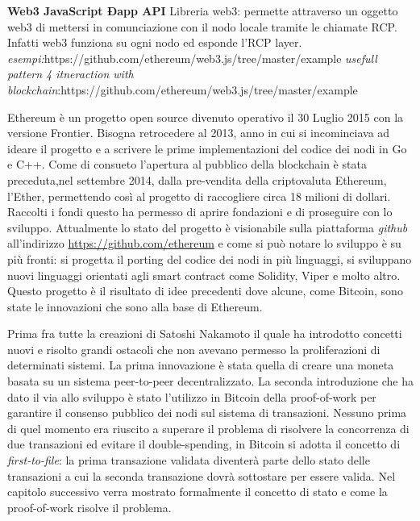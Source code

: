 \begin{enumerate}
		
		\textbf{Web3 JavaScript Ðapp API} 
		Libreria web3: permette attraverso un oggetto web3 di mettersi in comunciazione con il nodo locale tramite le chiamate RCP. Infatti web3 funziona su ogni nodo ed esponde l'RCP layer.
		\textit{esempi:}https://github.com/ethereum/web3.js/tree/master/example
		\textit{usefull pattern 4 itneraction with blockchain}:https://github.com/ethereum/web3.js/tree/master/example
		\fi
		
		\end{enumerate} 
	\fi
	
	Ethereum è un progetto open source divenuto operativo il 30 Luglio 2015 con la versione Frontier. Bisogna retrocedere al 2013, anno in cui si incominciava ad ideare il progetto e a scrivere le prime implementazioni del codice dei nodi in Go e C++. Come di consueto l'apertura al pubblico della blockchain è stata preceduta,nel settembre 2014, dalla pre-vendita della criptovaluta Ethereum, l'Ether, permettendo così al progetto di raccogliere circa 18 milioni di dollari. Raccolti i fondi questo ha permesso di aprire fondazioni e di proseguire con lo sviluppo. Attualmente lo stato del progetto è visionabile sulla piattaforma \textit{github} all'indirizzo \url{https://github.com/ethereum} e come si può notare lo sviluppo è su più fronti: si progetta il porting del codice dei nodi in più linguaggi, si sviluppano nuovi linguaggi orientati agli smart contract come Solidity, Viper e molto altro.
	Questo progetto è il risultato di idee precedenti dove alcune, come Bitcoin, sono state le innovazioni che sono alla base di Ethereum.
	
	Prima fra tutte la creazioni di Satoshi Nakamoto il quale ha introdotto concetti nuovi e risolto grandi ostacoli che non avevano permesso la proliferazioni di determinati sistemi. La prima innovazione è stata quella di creare una moneta basata su un sistema peer-to-peer decentralizzato. La seconda introduzione che ha dato il via allo sviluppo è stato l'utilizzo in Bitcoin della proof-of-work per garantire il consenso pubblico dei nodi sul sistema di transazioni. Nessuno prima di quel momento era riuscito a superare il problema di risolvere la concorrenza di due transazioni ed evitare il double-spending, in Bitcoin si adotta il concetto di \textit{first-to-file}: la prima transazione validata diventerà parte dello stato delle transazioni a cui la seconda transazione dovrà sottostare per essere valida\cite{nakamoto2008bitcoin}. Nel capitolo successivo verra mostrato formalmente il concetto di stato e come la proof-of-work risolve il problema.
	
